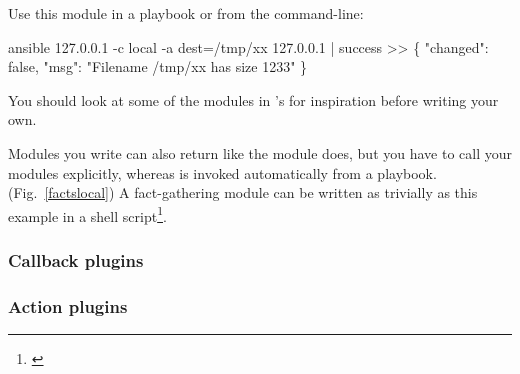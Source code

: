 Use this module in a playbook or from the command-line:

\begin{extymeta}
ansible 127.0.0.1 -c local  -a dest=/tmp/xx
127.0.0.1 | success >> \{
    "changed": false, 
    "msg": "Filename /tmp/xx has size 1233"
\}
\end{extymeta}

You should look at some of the modules in \ansible{}'s  for
inspiration before writing your own.

Modules you write can also return  like the  module does, but
you have to call your modules explicitly, whereas  is invoked
automatically from a playbook. (Fig.~\ref{factslocal}) A fact-gathering module
can be written as trivially as this example in a shell script\footnote{\url{}}.




\subsubsection*{Callback plugins}

\subsubsection*{Action plugins}
